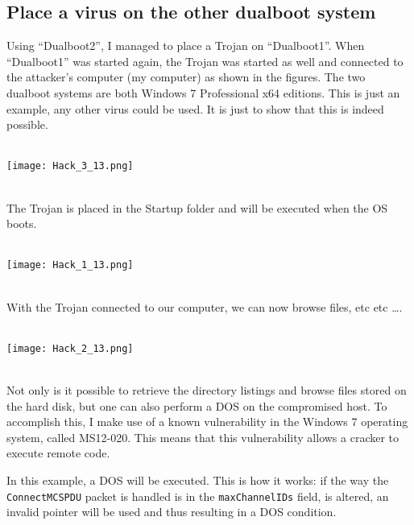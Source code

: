 \subsection*{Place a virus on the other dualboot system}

Using ``Dualboot2'', I managed to place a Trojan on ``Dualboot1''. When ``Dualboot1'' was started again, the Trojan was started as well and connected to the attacker's computer (my computer) as shown in the figures. The two dualboot systems are both Windows 7 Professional x64 editions. This is just an example, any other virus could be used. It is just to show that this is indeed possible.
$\;$ \\ \\
\noindent\begin{minipage}{\textwidth}
    \centering
    \texttt{[image: Hack\_3\_13.png]}
\end{minipage}
$\;$ \\ \\
The Trojan is placed in the Startup folder and will be executed when the OS boots. \\ \\
\noindent\begin{minipage}{\textwidth}
    \centering
    \texttt{[image: Hack\_1\_13.png]}
\end{minipage}
$\;$ \\ \\
With the Trojan connected to our computer, we can now browse files, etc etc \ldots . \\ \\
\noindent\begin{minipage}{\textwidth}
    \centering
    \texttt{[image: Hack\_2\_13.png]}
\end{minipage}
$\;$ \\ \\
Not only is it possible to retrieve the directory listings and browse files stored on the hard disk, but one can also perform a DOS on the compromised host. To accomplish this, I make use of a known vulnerability in the Windows 7 operating system, called MS12-020. This means that this vulnerability allows a cracker to execute remote code.

In this example, a DOS will be executed. This is how it works: if the way the \texttt{ConnectMCSPDU} packet is handled is in the \texttt{maxChannelIDs} field, is altered,  an invalid pointer will be used and thus resulting in a DOS condition.

